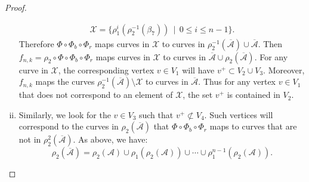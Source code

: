 \begin{proof}
\begin{enumerate}[(i)]
\begin{align*}
    \mathcal{X} = \{ \rho_1^i(\rho_2^{-1}(\beta_7))\,\mid\,0\leq i\leq n-1\}.
  \end{align*}
  Therefore $\Phi\circ\Phi_b\circ\Phi_r$ maps curves in $\mathcal{X}$ to curves in $\rho_2^{-1}(\overline{\mathcal{A}})\cup\overline{\mathcal{A}}$.  Then $f_{n,k}=\rho_2\circ\Phi\circ\Phi_b\circ\Phi_r$ maps curves in $\mathcal{X}$ to curves in $\overline{\mathcal{A}}\cup\rho_2(\overline{\mathcal{A}}).$  %
For any curve in $\mathcal{X}$, the corresponding vertex $v\in V_1$ will have
  $v^+ \subset V_2 \cup V_3.$  Moreover, $f_{n,k}$ maps the curves $\rho_2^{-1}(\overline{\mathcal{A}})\setminus \mathcal{X}$ to curves in $\overline{\mathcal{A}}$.  Thus for any vertex $v\in V_1$ that does not correspond to an element of $\mathcal{X}$, the set $v^+$ is contained in $V_2$.
\item  Similarly, we look for the $v \in V_3$ such that $v^+ \not\subset V_4$.  Such vertices will correspond to the curves in $\rho_2(\overline{\mathcal{A}})$ that $\Phi\circ\Phi_b\circ\Phi_r$ maps to curves that are not in $\rho_2^2(\overline{\mathcal{A}})$.  As above, we have: $$\rho_2(\overline{\mathcal{A}})=\rho_2(\mathcal{A})\cup\rho_1(\rho_2(\mathcal{A}))\cup\cdots\cup\rho_1^{n-1}(\rho_2(\mathcal{A})).$$

\end{enumerate}
\end{proof}
